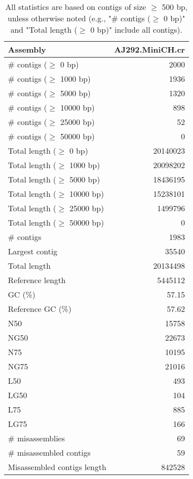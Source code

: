 \documentclass[12pt,a4paper]{article}
\begin{document}
\begin{table}[ht]
\begin{center}
\caption{All statistics are based on contigs of size $\geq$ 500 bp, unless otherwise noted (e.g., "\# contigs ($\geq$ 0 bp)" and "Total length ($\geq$ 0 bp)" include all contigs).}
\begin{tabular}{|l*{1}{|r}|}
\hline
Assembly & AJ292.MiniCH.cr \\ \hline
\# contigs ($\geq$ 0 bp) & 2000 \\ \hline
\# contigs ($\geq$ 1000 bp) & 1936 \\ \hline
\# contigs ($\geq$ 5000 bp) & 1320 \\ \hline
\# contigs ($\geq$ 10000 bp) & 898 \\ \hline
\# contigs ($\geq$ 25000 bp) & 52 \\ \hline
\# contigs ($\geq$ 50000 bp) & 0 \\ \hline
Total length ($\geq$ 0 bp) & 20140023 \\ \hline
Total length ($\geq$ 1000 bp) & 20098202 \\ \hline
Total length ($\geq$ 5000 bp) & 18436195 \\ \hline
Total length ($\geq$ 10000 bp) & 15238101 \\ \hline
Total length ($\geq$ 25000 bp) & 1499796 \\ \hline
Total length ($\geq$ 50000 bp) & 0 \\ \hline
\# contigs & 1983 \\ \hline
Largest contig & 35540 \\ \hline
Total length & 20134498 \\ \hline
Reference length & 5445112 \\ \hline
GC (\%) & 57.15 \\ \hline
Reference GC (\%) & 57.62 \\ \hline
N50 & 15758 \\ \hline
NG50 & 22673 \\ \hline
N75 & 10195 \\ \hline
NG75 & 21016 \\ \hline
L50 & 493 \\ \hline
LG50 & 104 \\ \hline
L75 & 885 \\ \hline
LG75 & 166 \\ \hline
\# misassemblies & 69 \\ \hline
\# misassembled contigs & 59 \\ \hline
Misassembled contigs length & 842528 \\ \hline

\end{tabular}
\end{center}
\end{table}
\end{document}

